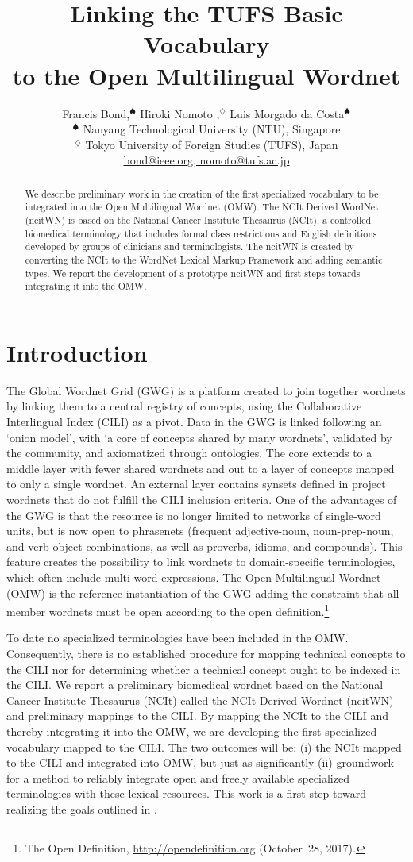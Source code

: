 \documentclass[11pt]{article}
\title{Linking the TUFS Basic Vocabulary \\ to the Open Multilingual Wordnet}
\author{
	Francis Bond,$^\spadesuit$ 
	Hiroki Nomoto ,$^\diamondsuit$
	Luis Morgado da Costa$^\spadesuit$\\
  $^\spadesuit$ Nanyang Technological University (NTU),  Singapore\\
  $^\diamondsuit$
  Tokyo University of Foreign Studies (TUFS), Japan \\
  \url{bond@ieee.org, nomoto@tufs.ac.jp} }
\date{}
\begin{document}
\maketitle
\begin{abstract}
We describe preliminary work in the creation of the first specialized vocabulary to be integrated into the Open Multilingual Wordnet (OMW). The NCIt Derived WordNet (ncitWN) is based on the National Cancer Institute Thesaurus (NCIt), a controlled biomedical terminology that includes formal %
class restrictions and English definitions  developed by groups of clinicians and terminologists. The ncitWN is created by converting the NCIt to the WordNet Lexical Markup Framework and adding semantic types. We report the development of a prototype ncitWN and first steps towards integrating it into the OMW.
\end{abstract}
\section{Introduction}
The Global Wordnet Grid (GWG) is a platform created to join together wordnets by linking them to a central registry of concepts, using the Collaborative Interlingual Index (CILI) as a pivot.  Data in the GWG is linked following an `onion model', with `a core of concepts shared by many wordnets', validated by the community, and axiomatized through ontologies. The core extends to a middle layer with fewer shared wordnets and out to a layer of concepts mapped to only a single wordnet. An external layer contains synsets defined in project wordnets that do not fulfill the CILI inclusion criteria. One of the advantages of the GWG is that the resource is no longer limited to networks of single-word units, but is now open to phrasenets (frequent adjective-noun, noun-prep-noun, and verb-object combinations, as well as proverbs, idioms, and compounds). This feature creates the possibility to link wordnets to domain-specific terminologies, which often include multi-word expressions.  The Open Multilingual Wordnet (OMW) is the reference instantiation of the GWG \citep{Bond:2016a} adding the constraint that all member wordnets must be open according to the open definition.\footnote{The Open Definition, \url{http://opendefinition.org} (October~28, 2017).}

To date no specialized terminologies have been included in the OMW. Consequently, there is no established procedure for mapping technical concepts to the CILI nor for determining whether a technical concept ought to be indexed in the CILI. We report a preliminary biomedical wordnet based on the National Cancer Institute Thesaurus (NCIt) called the NCIt Derived Wordnet (ncitWN) and preliminary mappings to the CILI. By mapping the NCIt to the CILI and thereby integrating it into the OMW, we are developing the first specialized vocabulary mapped to the CILI. The two outcomes will be: (i) the NCIt mapped to the CILI and integrated into OMW, but just as significantly (ii) groundwork for a method to reliably integrate open and freely available specialized terminologies with these lexical resources. This work is a first step toward realizing the goals outlined in \citet{smith2004medical}.
\end{document}
